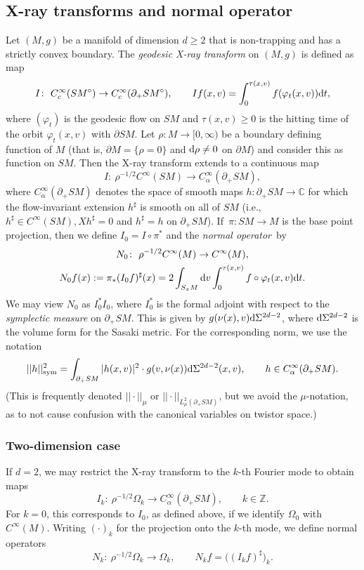 \documentclass[pdftex]{sigma}
\numberwithin{equation}{section}
\theoremstyle{definition}
\newcommand{\Z}{\mathbb{Z}} %
\newcommand{\C}{\mathbb{C}} %
\newcommand{\1}{{\bf 1}}
\begin{document}
\subsection{X-ray transforms and normal operator}\label{s_geoxray} Let $(M,g)$ be a manifold of dimension $d\ge 2$ that is non-trapping
and has a strictly convex boundary.
The
 {\it geodesic X-ray transform} on $(M,g)$ is defined as map
\[
	I\colon\ C_c^\infty(SM^\circ)\rightarrow C^\infty_c(\partial_+SM^\circ),\qquad If(x,v)=\int_0^{\tau(x,v)} f(\varphi_t(x,v)) {\rm d}t,
\]
where $(\varphi_t)$ is the geodesic flow on $SM$ and $\tau(x,v)\ge 0$ is the hitting time of the orbit $\varphi_t(x,v)$ with $\partial SM$. Let $\rho\colon M\to [0,\infty)$ be a boundary defining function of $M$ (that is, $\partial M= \{\rho=0\}$ and ${\rm d}\rho \neq 0$ on $\partial M$) and consider this as function on $SM$. Then the X-ray transform extends to a continuous map
\begin{equation}\label{def_xray}
	I\colon\ \rho^{-1/2}C^\infty(SM)\rightarrow C_\alpha^\infty(\partial_+SM),
\end{equation}
where $C_\alpha^\infty(\partial_+SM)$ denotes the space of smooth maps $h\colon \partial_+SM\rightarrow \C$ for which the flow-invariant extension $h^\sharp$ is smooth on all of $SM$ (i.e., $h^\sharp \in C^\infty(SM), Xh^\sharp =0$ and $h^\sharp = h$ on $\partial_+SM$). If~${\pi\colon SM\rightarrow M}$ is the base point projection, then we define $I_0=I\circ \pi^*$ and the {\it normal operator}~by
\begin{gather*}
	N_0\colon \ \rho^{-1/2}C^\infty(M)\rightarrow C^\infty(M),\\
 N_0 f(x):= \pi_*(I_0 f)^\sharp(x) = 2\int_{S_x M} {\rm d}v \int_0^{\tau(x,v)} f\circ \varphi_t(x,v) {\rm d}t.
\end{gather*}
We may view $N_0$ as $I_0^* I_0$, where $I_0^*$ is the formal adjoint with respect to the {\it symplectic measure} on $\partial_+SM$. This is given by $g(\nu(x),v) {\rm d}\Sigma^{2d-2}$, where ${\rm d} \Sigma^{2d-2}$ is the volume form for the {Sasaki metric}. For the corresponding norm, we use the notation
\[
|| h ||_{\mathrm{sym}}^2 = \int_{\partial_+SM} |h(x,v)|^2\cdot g(v,\nu(x)) {\rm d}\Sigma^{2d-2}(x,v),\qquad h\in C_\alpha^\infty(\partial_+SM).
\]
(This is frequently denoted $||\cdot||_\mu$ or $||\cdot||_{L^2_\mu(\partial_+SM)}$, but we avoid the $\mu$-notation, as to not cause confusion with the canonical variables on twistor space.)


\subsubsection{Two-dimension case}
If $d=2$, we may restrict the X-ray transform to the $k$-th Fourier mode to obtain maps
\[
I_k\colon\ \rho^{-1/2} \Omega_k\rightarrow C_\alpha^\infty(\partial_+SM),\qquad k\in \Z.
\]
For $k=0$, this corresponds to $I_0$, as defined above, if we identify $\Omega_0$ with $C^\infty(M)$. Writing $(\cdot)_k$ for the projection onto the $k$-th mode, we define normal operators
\[
	N_k\colon\ \rho^{-1/2}\Omega_k\rightarrow \Omega_k,\qquad N_k f = \bigl((I_k f)^\sharp\bigr)_k.
\]
\end{document}
